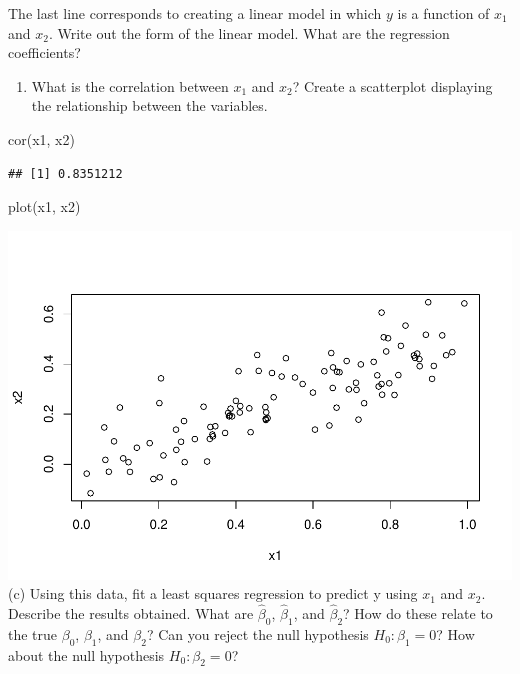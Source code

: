\documentclass[
]{article}
\newenvironment{Shaded}{\begin{snugshade}}{\end{snugshade}}
\newcommand{\FunctionTok}[1]{\textcolor[rgb]{0.00,0.00,0.00}{#1}}
\newcommand{\NormalTok}[1]{#1}
\providecommand{\tightlist}{%
  \setlength{\itemsep}{0pt}\setlength{\parskip}{0pt}}
\begin{document}
The last line corresponds to creating a linear model in which \(y\) is a
function of \(x_1\) and \(x_2\). Write out the form of the linear model.
What are the regression coefficients?

\begin{enumerate}
\def\labelenumi{(\alph{enumi})}
\setcounter{enumi}{1}
\tightlist
\item
  What is the correlation between \(x_1\) and \(x_2\)? Create a
  scatterplot displaying the relationship between the variables.
\end{enumerate}

\begin{Shaded}
\begin{Highlighting}[]
\FunctionTok{cor}\NormalTok{(x1, x2)}
\end{Highlighting}
\end{Shaded}

\begin{verbatim}
## [1] 0.8351212
\end{verbatim}

\begin{Shaded}
\begin{Highlighting}[]
\FunctionTok{plot}\NormalTok{(x1, x2)}
\end{Highlighting}
\end{Shaded}

\includegraphics{math4322_fall21_hw2_files/figure-latex/unnamed-chunk-17-1.pdf}
(c) Using this data, fit a least squares regression to predict y using
\(x_1\) and \(x_2\). Describe the results obtained. What are
\(\hat{\beta}_0\), \(\hat{\beta}_1\), and \(\hat{\beta}_2\)? How do
these relate to the true \(\beta_0\), \(\beta_1\), and \(\beta_2\)? Can
you reject the null hypothesis \(H_0 : \beta_1 = 0\)? How about the null
hypothesis \(H_0 : \beta_2 = 0\)?
\end{document}
